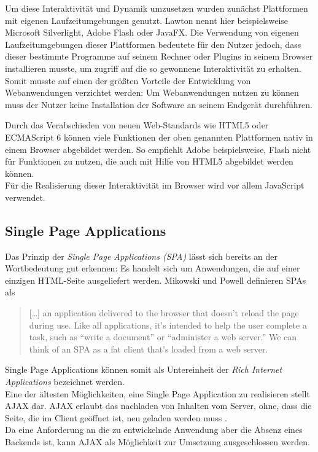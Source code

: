 Um diese Interaktivität und Dynamik umzusetzen wurden zunächst Plattformen mit eigenen Laufzeitumgebungen genutzt. Lawton \cite{lawton2008new} nennt hier beispielsweise Microsoft Silverlight, Adobe Flash oder JavaFX.
Die Verwendung von eigenen Laufzeitumgebungen dieser Plattformen  bedeutete für den Nutzer jedoch,  dass dieser bestimmte Programme auf seinem Rechner oder Plugins in seinem Browser installieren musste, um zugriff auf die so gewonnene Interaktivität zu erhalten. Somit musste auf einen der größten Vorteile der Entwicklung von Webanwendungen verzichtet werden: Um Webanwendungen nutzen zu können muss der Nutzer keine Installation der Software an seinem Endgerät durchführen.

Durch das Verabschieden von neuen Web-Standards wie HTML5 oder ECMAScript 6 können viele Funktionen der oben genannten Plattformen nativ in einem Browser abgebildet werden. So empfiehlt Adobe beispielsweise, Flash nicht für Funktionen zu nutzen, die auch mit Hilfe von HTML5 abgebildet werden können\footnotemark{}.\\
Für die Realisierung dieser Interaktivität im Browser wird vor allem JavaScript verwendet.


\subsection{Single Page Applications}
Das Prinzip der \textit{Single Page Applications (SPA)} lässt sich bereits an der Wortbedeutung gut erkennen: Es handelt sich um Anwendungen, die auf einer einzigen HTML-Seite ausgeliefert werden.
Mikowski und Powell definieren SPAs als

\begin{quote}
  […] an application delivered to the browser that doesn’t reload the page during use. Like all applications, it’s intended to help the user complete a task, such as “write a document” or “administer a web server.” We can think of an SPA as a fat client that’s loaded from a web server. \cite{MikowskiPowell201309}
\end{quote}

Single Page Applications können somit als Untereinheit der \textit{Rich Internet Applications} bezeichnet werden.\\
Eine der ältesten Möglichkeiten, eine Single Page Application zu realisieren stellt AJAX dar. AJAX erlaubt das nachladen von Inhalten  vom Server, ohne, dass die Seite, die im Client geöffnet ist, neu geladen werden muss \cite{paulson2005building}.\\
Da eine Anforderung an die zu entwickelnde Anwendung aber die Absenz eines Backends ist, kann AJAX als Möglichkeit zur Umsetzung ausgeschlossen werden.

